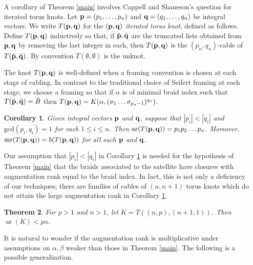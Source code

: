 \documentclass[11pt]{amsart}
\def\s{{\sigma}}
\def\ar{\operatorname{ar}}
\def\mr{\operatorname{mr}}
\newtheorem{thm}{Theorem}[section]
\newtheorem{cor}[thm]{Corollary}
\theoremstyle{definition}
\newtheorem{rem}[thm]{Remark}
\begin{document}
A corollary of Theorem \ref{main} involves Cappell and Shaneson's question for iterated torus knots. Let ${\bf p}=(p_1,\ldots,p_n)$ and ${\bf q}=(q_1,\ldots,q_n)$ be integral vectors. We write $T({\bf p},{\bf q})$ for the $({\bf p},{\bf q})$ \emph{iterated torus knot}, defined as follows. Define $T({\bf p},{\bf q})$ inductively so that, if $\hat{\bf p}, \hat{\bf q}$ are the truncated lists obtained from ${\bf p},{\bf q}$ by removing the last integer in each, then $T({\bf p},{\bf q})$ is the $(p_n,q_n)$-cable of $T(\hat{\bf p},\hat{\bf q})$. By convention $T(\emptyset,\emptyset)$ is the unknot.

The knot $T({\bf p},{\bf q})$ is well-defined when a framing convention is chosen at each stage of cabling. In contrast to the traditional choice of Seifert framing at each stage, we choose a framing so that if $\alpha$ is of minimal braid index such that $T(\hat{\bf p},\hat{\bf q}) = \hat{B}$ then $T({\bf p},{\bf q}) = K(\alpha,(\s_1\ldots\s_{p_n-1})^{q_n})$.

\begin{cor}\label{cor:iteratedCables}
Given integral vectors ${\bf p}$ and ${\bf q}$, suppose that $|p_i|<|q_i|$ and $\text{gcd}(p_i,q_i)=1$ for each $1\le i\le n$. Then $\ar(T({\bf p},{\bf q}))=p_1p_2\ldots p_n$. Moreover, $\mr(T({\bf p},{\bf q})) = b(T({\bf p},{\bf q}))$ for all such ${\bf p}$ and ${\bf q}$.
\end{cor}

Our assumption that $|p_i|<|q_i|$ in Corollary \ref{cor:iteratedCables} is needed for the hypothesis of Theorem \ref{main} that the braids associated to the satellite have closures with augmentation rank equal to the braid index. In fact, this is not only a deficiency of our techniques; there are families of cables of $(n,n+1)$ torus knots which do not attain the large augmentation rank in Corollary \ref{cor:iteratedCables}.

\begin{thm}\label{ThmNNPlus1}For $p>1$ and $n>1$, let $K=T((n,p),(n+1,1))$. Then $\ar(K) < pn$.
\end{thm}

It is natural to wonder if the augmentation rank is multiplicative under assumptions on $\alpha, \beta$ weaker than those in Theorem \ref{main}. The following is a possible generalization.
\end{document}

